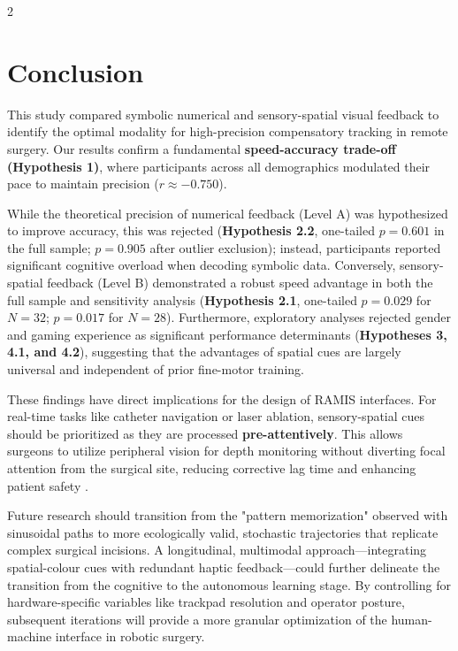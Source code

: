 \documentclass[a4paper,12pt]{article}
\begin{document}
\begin{multicols}{2}
\section{Conclusion}
This study compared symbolic numerical and sensory-spatial visual feedback to identify the optimal modality for high-precision compensatory tracking in remote surgery. Our results confirm a fundamental \textbf{speed-accuracy trade-off (Hypothesis 1)}, where participants across all demographics modulated their pace to maintain precision ($r \approx -0.750$). 

While the theoretical precision of numerical feedback (Level A) was hypothesized to improve accuracy, this was rejected (\textbf{Hypothesis 2.2}, one-tailed $p = 0.601$ in the full sample; $p = 0.905$ after outlier exclusion); instead, participants reported significant cognitive overload when decoding symbolic data. Conversely, sensory-spatial feedback (Level B) demonstrated a robust speed advantage in both the full sample and sensitivity analysis (\textbf{Hypothesis 2.1}, one-tailed $p = 0.029$ for $N=32$; $p = 0.017$ for $N=28$). Furthermore, exploratory analyses rejected gender and gaming experience as significant performance determinants (\textbf{Hypotheses 3, 4.1, and 4.2}), suggesting that the advantages of spatial cues are largely universal and independent of prior fine-motor training.

These findings have direct implications for the design of RAMIS interfaces. For real-time tasks like catheter navigation or laser ablation, sensory-spatial cues should be prioritized as they are processed \textbf{pre-attentively}. This allows surgeons to utilize peripheral vision for depth monitoring without diverting focal attention from the surgical site, reducing corrective lag time and enhancing patient safety \cite{bethea2004haptic}.

Future research should transition from the "pattern memorization" observed with sinusoidal paths to more ecologically valid, stochastic trajectories that replicate complex surgical incisions. A longitudinal, multimodal approach—integrating spatial-colour cues with redundant haptic feedback—could further delineate the transition from the cognitive to the autonomous learning stage. By controlling for hardware-specific variables like trackpad resolution and operator posture, subsequent iterations will provide a more granular optimization of the human-machine interface in robotic surgery.
\end{multicols}
\newpage
\onecolumn


\newpage
\end{document}

